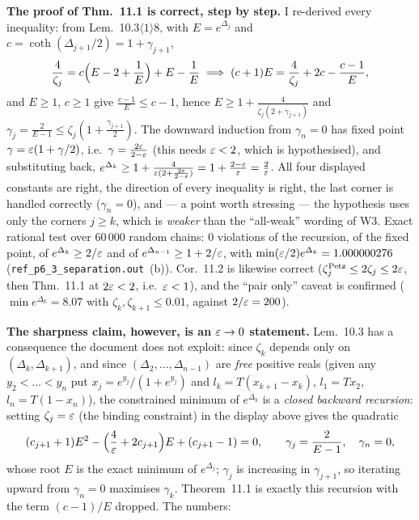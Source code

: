 \documentclass[11pt]{article}
\theoremstyle{definition}\newtheorem{example}[theorem]{Example}
\begin{document}
\textbf{The proof of Thm.~11.1 is correct, step by step.}  I re-derived every inequality:
from Lem.~10.3$\langle1\rangle8$, with $E=e^{\Delta_j}$ and $c=\coth(\Delta_{j+1}/2)
=1+\gamma_{j+1}$,
\[
 \frac4{\zeta_j}=c\Bigl(E-2+\frac1E\Bigr)+E-\frac1E
 \;\Longrightarrow\;(c+1)E=\frac4{\zeta_j}+2c-\frac{c-1}E ,
\]
and $E\ge1$, $c\ge1$ give $\frac{c-1}E\le c-1$, hence $E\ge1+\frac4{\zeta_j(2+\gamma_{j+1})}$
and $\gamma_j=\frac2{E-1}\le\zeta_j(1+\frac{\gamma_{j+1}}2)$.  The downward induction from
$\gamma_n=0$ has fixed point $\gamma=\varepsilon(1+\gamma/2)$, i.e.\ $\gamma=\frac{2\varepsilon}{2-\varepsilon}$
(this needs $\varepsilon<2$, which is hypothesised), and substituting back,
$e^{\Delta_k}\ge1+\frac4{\varepsilon(2+\frac{2\varepsilon}{2-\varepsilon})}=1+\frac{2-\varepsilon}{\varepsilon}=\frac2{\varepsilon}$.
All four displayed constants are right, the direction of every inequality is right, the
last corner is handled correctly ($\gamma_n=0$), and --- a point worth stressing --- the
hypothesis uses only the corners $j\ge k$, which is \emph{weaker} than the ``all-weak''
wording of W3.  Exact rational test over $60\,000$ random chains: $0$ violations of the
recursion, of the fixed point, of $e^{\Delta_k}\ge2/\varepsilon$ and of
$e^{\Delta_{n-1}}\ge1+2/\varepsilon$, with $\min(\varepsilon/2)e^{\Delta_k}=1.000000276$
(\texttt{ref\_p6\_3\_separation.out}~(b)).  Cor.~11.2 is likewise correct
($\zeta_j^{\rm Petz}\le2\zeta_j\le2\varepsilon$, then Thm.~11.1 at $2\varepsilon<2$, i.e.\ $\varepsilon<1$),
and the ``pair only'' caveat is confirmed ($\min e^{\Delta_k}=8.07$ with
$\zeta_k,\zeta_{k+1}\le0.01$, against $2/\varepsilon=200$).

\textbf{The sharpness claim, however, is an $\varepsilon\to0$ statement.}  Lem.~10.3 has a
consequence the document does not exploit: since $\zeta_k$ depends only on
$(\Delta_k,\Delta_{k+1})$, and since $(\Delta_2,\dots,\Delta_{n-1})$ are \emph{free}
positive reals (given any $y_2<\dots<y_n$ put $x_j=e^{y_j}/(1+e^{y_j})$ and
$l_k=T(x_{k+1}-x_k)$, $l_1=Tx_2$, $l_n=T(1-x_n)$), the constrained minimum of
$e^{\Delta_k}$ is a \emph{closed backward recursion}: setting $\zeta_j=\varepsilon$ (the binding
constraint) in the display above gives the quadratic
\[
 (c_{j+1}+1)E^2-\Bigl(\frac4{\varepsilon}+2c_{j+1}\Bigr)E+(c_{j+1}-1)=0 ,\qquad
 \gamma_j=\frac2{E-1},\quad \gamma_n=0 ,
\]
whose root $E$ is the exact minimum of $e^{\Delta_j}$; $\gamma_j$ is increasing in
$\gamma_{j+1}$, so iterating upward from $\gamma_n=0$ maximises $\gamma_k$.  Theorem~11.1
is exactly this recursion with the term $(c-1)/E$ dropped.  The numbers:
\end{document}
